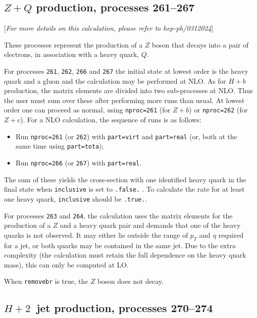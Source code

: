 \documentclass[12pt]{article}
\begin{document}
\subsection{$Z+Q$ production, processes 261--267}
\label{subsec:ZQ}

\begin{center}
[{\it For more details on this calculation, please refer to hep-ph/0312024}]
\end{center}

These processes represent the production of a $Z$
boson that decays into a pair of electrons,
in association with a heavy quark, $Q$.

For processes {\tt 261}, {\tt 262}, {\tt 266} and {\tt 267} the initial
state at lowest order is the heavy quark and a gluon and 
the calculation may be performed at NLO.
As for $H+b$ production, the matrix elements are divided into two
sub-processes at NLO. Thus the user must sum over these after performing
more runs than usual. At lowest order one can proceed as normal, using
{\tt nproc=261} (for $Z+b$) or {\tt nproc=262} (for $Z+c$).
For a NLO calculation, the sequence of runs is as follows:
\begin{itemize}
\item Run {\tt nproc=261} (or {\tt 262}) with {\tt part=virt} and
{\tt part=real} (or, both at the same time using {\tt part=tota});
\item Run {\tt nproc=266} (or {\tt 267}) with {\tt part=real}.
\end{itemize}
The sum of these yields the cross-section with one identified heavy quark in
the final state when {\tt inclusive} is set to {\tt .false.} . To calculate the
rate for at least one heavy quark, {\tt inclusive} should be {\tt .true.}.

For processes {\tt 263} and
{\tt 264}, the calculation uses the matrix elements for the production
of a $Z$ and a heavy quark pair and demands that one of the heavy quarks
is not observed. It may either lie outside the range of $p_T$ and $\eta$
required for a jet, or both quarks may be contained in the same jet.
Due to the extra complexity (the calculation must retain the full
dependence on the heavy quark mass), this can only be computed at LO.

When {\tt removebr} is true, the $Z$ boson does not decay.

\subsection{$H + 2$~jet production, processes 270--274}
\end{document}
